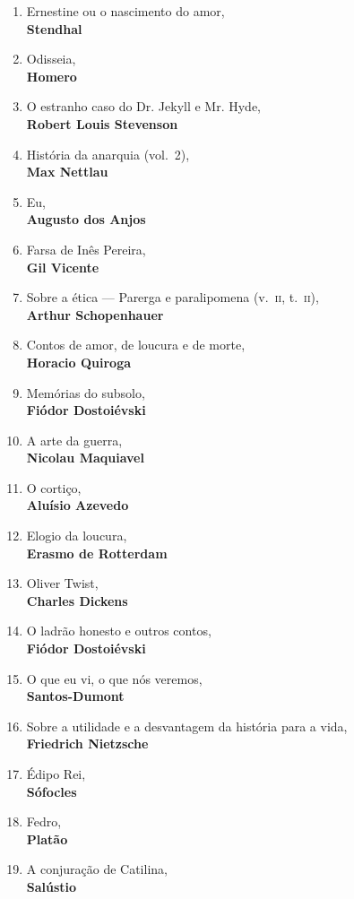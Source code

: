 \begin{enumerate} [font=\Formular\scriptsize]
\item Ernestine ou o nascimento do amor,\\ \textbf{Stendhal}
\item Odisseia,\\ \textbf{Homero}
\item O estranho caso do Dr. Jekyll e Mr. Hyde,\\ \textbf{Robert Louis Stevenson}
\item História da anarquia (vol.~2),\\ \textbf{Max Nettlau}
\item Eu,\\ \textbf{Augusto dos Anjos}
\item Farsa de Inês Pereira,\\ \textbf{Gil Vicente}
\item Sobre a ética --- Parerga e paralipomena (v.~\textsc{ii}, t.~\textsc{ii}),\\ \textbf{Arthur Schopenhauer} 
\item Contos de amor, de loucura e de morte,\\ \textbf{Horacio Quiroga}
\item Memórias do subsolo,\\ \textbf{Fiódor Dostoiévski}
\item A arte da guerra,\\ \textbf{Nicolau Maquiavel}
\item O cortiço,\\ \textbf{Aluísio Azevedo}
\item Elogio da loucura,\\ \textbf{Erasmo de Rotterdam}
\item Oliver Twist,\\ \textbf{Charles Dickens}
\item O ladrão honesto e outros contos,\\ \textbf{Fiódor Dostoiévski}
\item O que eu vi, o que nós veremos,\\ \textbf{Santos-Dumont}
\item Sobre a utilidade e a desvantagem da história para a vida,\\ \textbf{Friedrich Nietzsche}
\item Édipo Rei,\\ \textbf{Sófocles}
\item Fedro,\\ \textbf{Platão}
\item A conjuração de Catilina,\\ \textbf{Salústio}
\end{enumerate}

